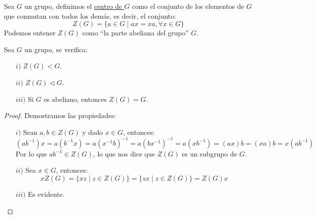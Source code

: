 \begin{definicion}[Centro]
    Sea $G$ un grupo, definimos el \underline{centro de $G$} como el conjunto de los elementos de $G$ que conmutan con todos los demás, es decir, el conjunto:
    \begin{equation*}
        Z(G) = \{a\in G \mid ax = xa, \forall x\in G\}
    \end{equation*}
Podemos entener $Z(G)$ como ``la parte abeliana del grupo'' $G$.
\end{definicion}

\begin{prop}
    Sea $G$ un grupo, se verifica:
    \begin{enumerate}
        \item[$i)$] $Z(G)<G$.
        \item[$ii)$] $Z(G)\lhd G$.
        \item[$iii)$] Si $G$ es abeliano, entonces $Z(G) = G$.
    \end{enumerate}
    \begin{proof}
        Demostramos las propiedades:
        \begin{enumerate}
            \item[$i)$] Sean $a,b\in Z(G)$ y dado $x\in G$, entonces:
                \begin{equation*}
                    (ab^{-1})x = a(b^{-1}x) = a{(x^{-1}b)}^{-1} = a{(bx^{-1})}^{-1} = a(xb^{-1}) = (ax)b = (xa)b = x(ab^{-1})
                \end{equation*}
                Por lo que $ab^{-1}\in Z(G)$, lo que nos dice que $Z(G)$ es un subgrupo de $G$.
            \item[$ii)$] Sea $x\in G$, entonces:
                \begin{equation*}
                    xZ(G) = \{xz \mid z\in Z(G)\} = \{zx \mid z\in Z(G)\} = Z(G)x
                \end{equation*}
            \item[$iii)$] Es evidente.
        \end{enumerate}
    \end{proof}
\end{prop}

